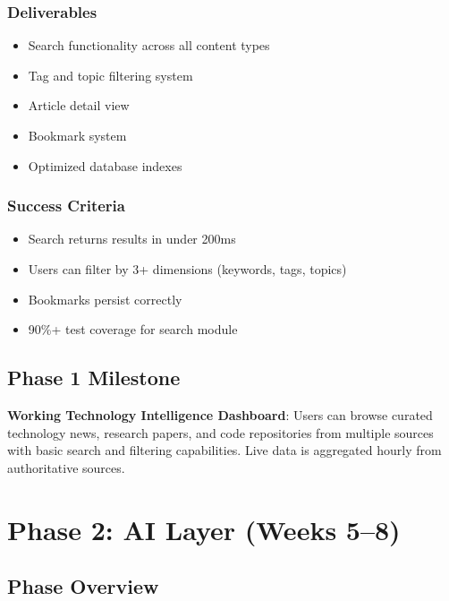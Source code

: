 \documentclass[12pt,oneside]{report}
\begin{document}
\subsubsection{Deliverables}

\begin{itemize}
    \item Search functionality across all content types
    \item Tag and topic filtering system
    \item Article detail view
    \item Bookmark system
    \item Optimized database indexes
\end{itemize}

\subsubsection{Success Criteria}

\begin{itemize}
    \item Search returns results in under 200ms
    \item Users can filter by 3+ dimensions (keywords, tags, topics)
    \item Bookmarks persist correctly
    \item 90\%+ test coverage for search module
\end{itemize}

\subsection{Phase 1 Milestone}

\textbf{Working Technology Intelligence Dashboard}: Users can browse curated technology news, research papers, and code repositories from multiple sources with basic search and filtering capabilities. Live data is aggregated hourly from authoritative sources.

\section{Phase 2: AI Layer (Weeks 5--8)}

\subsection{Phase Overview}
\end{document}
